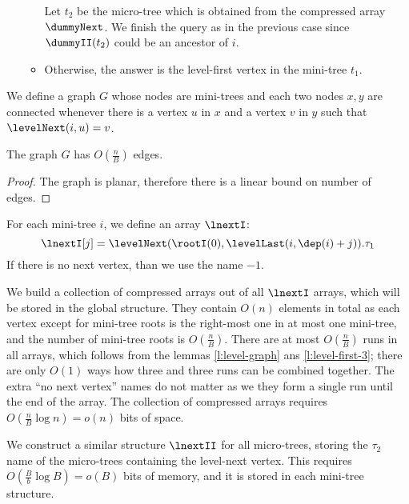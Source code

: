 \begin{enumerate}
\begin{itemize}
		Let $t_2$ be the micro-tree which is obtained from the compressed array $\dummyNext$.
		We finish the query as in the previous case since $\dummyII(t_2)$ could be an ancestor of $i$.
		
		\item Otherwise, the answer is the level-first vertex in the mini-tree $t_1$.
	\end{itemize}
\end{enumerate}

We define a graph $G$ whose nodes are mini-trees and each two nodes $x, y$ are connected whenever there is a vertex $u$ in $x$ and a vertex $v$ in $y$ such that $\levelNext(i, u) = v$.

\begin{lemma}\label{l:level-graph}
	The graph $G$ has $O(\frac{n}{B})$ edges.
\end{lemma}
\begin{proof}
	The graph is planar, therefore there is a linear bound on number of edges.
\end{proof}

For each mini-tree $i$, we define an array $\lnextI$:
$$ \lnextI[j] = \levelNext(\rootI(0), \levelLast(i, \dep(i) + j)).\tau_1$$
If there is no next vertex, than we use the name $-1$.

We build a collection of compressed arrays out of all $\lnextI$ arrays, which will be stored in the global structure.
They contain $O(n)$ elements in total as each vertex except for mini-tree roots is the right-most one in at most one mini-tree, and the number of mini-tree roots is $O(\frac{n}{B})$.
There are at most $O(\frac{n}{B})$ runs in all arrays, which follows from the lemmas \ref{l:level-graph} ans \ref{l:level-first-3}; there are only $O(1)$ ways how three and three runs can be combined together.
The extra ``no next vertex'' names do not matter as we they form a single run until the end of the array.
The collection of compressed arrays requires $O(\frac{n}{B} \log n) = o(n)$ bits of space.

We construct a similar structure $\lnextII$ for all micro-trees, storing the $\tau_2$ name of the micro-trees containing the level-next vertex.
This requires $O(\frac{B}{b} \log B) = o(B)$ bits of memory, and it is stored in each mini-tree structure.

